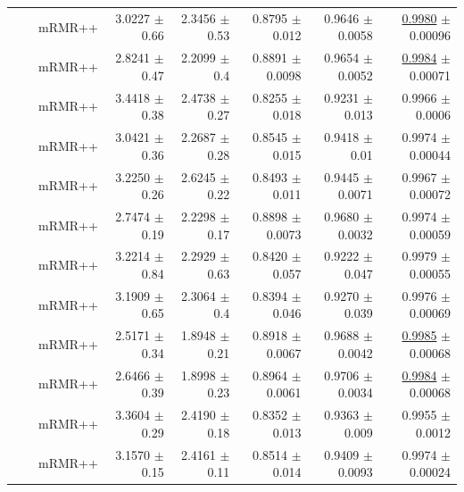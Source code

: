 \begin{longtable}{llp{}rrrrr}
 &  & mRMR++ & 3.0227 {\scriptsize $\pm$ 0.66} & 2.3456 {\scriptsize $\pm$ 0.53} & 0.8795 {\scriptsize $\pm$ 0.012} & 0.9646 {\scriptsize $\pm$ 0.0058} & \underline{0.9980} {\scriptsize $\pm$ 0.00096} \\
 &  & mRMR++ & 2.8241 {\scriptsize $\pm$ 0.47} & 2.2099 {\scriptsize $\pm$ 0.4} & 0.8891 {\scriptsize $\pm$ 0.0098} & 0.9654 {\scriptsize $\pm$ 0.0052} & \underline{0.9984} {\scriptsize $\pm$ 0.00071} \\
 &  & mRMR++ & 3.4418 {\scriptsize $\pm$ 0.38} & 2.4738 {\scriptsize $\pm$ 0.27} & 0.8255 {\scriptsize $\pm$ 0.018} & 0.9231 {\scriptsize $\pm$ 0.013} & 0.9966 {\scriptsize $\pm$ 0.0006} \\
 &  & mRMR++ & 3.0421 {\scriptsize $\pm$ 0.36} & 2.2687 {\scriptsize $\pm$ 0.28} & 0.8545 {\scriptsize $\pm$ 0.015} & 0.9418 {\scriptsize $\pm$ 0.01} & 0.9974 {\scriptsize $\pm$ 0.00044} \\
 &  & mRMR++ & 3.2250 {\scriptsize $\pm$ 0.26} & 2.6245 {\scriptsize $\pm$ 0.22} & 0.8493 {\scriptsize $\pm$ 0.011} & 0.9445 {\scriptsize $\pm$ 0.0071} & 0.9967 {\scriptsize $\pm$ 0.00072} \\
 &  & mRMR++ & 2.7474 {\scriptsize $\pm$ 0.19} & 2.2298 {\scriptsize $\pm$ 0.17} & 0.8898 {\scriptsize $\pm$ 0.0073} & 0.9680 {\scriptsize $\pm$ 0.0032} & 0.9974 {\scriptsize $\pm$ 0.00059} \\
 &  & mRMR++ & 3.2214 {\scriptsize $\pm$ 0.84} & 2.2929 {\scriptsize $\pm$ 0.63} & 0.8420 {\scriptsize $\pm$ 0.057} & 0.9222 {\scriptsize $\pm$ 0.047} & 0.9979 {\scriptsize $\pm$ 0.00055} \\
 &  & mRMR++ & 3.1909 {\scriptsize $\pm$ 0.65} & 2.3064 {\scriptsize $\pm$ 0.4} & 0.8394 {\scriptsize $\pm$ 0.046} & 0.9270 {\scriptsize $\pm$ 0.039} & 0.9976 {\scriptsize $\pm$ 0.00069} \\
 &  & mRMR++ & 2.5171 {\scriptsize $\pm$ 0.34} & 1.8948 {\scriptsize $\pm$ 0.21} & 0.8918 {\scriptsize $\pm$ 0.0067} & 0.9688 {\scriptsize $\pm$ 0.0042} & \underline{0.9985} {\scriptsize $\pm$ 0.00068} \\
 &  & mRMR++ & 2.6466 {\scriptsize $\pm$ 0.39} & 1.8998 {\scriptsize $\pm$ 0.23} & 0.8964 {\scriptsize $\pm$ 0.0061} & 0.9706 {\scriptsize $\pm$ 0.0034} & \underline{0.9984} {\scriptsize $\pm$ 0.00068} \\
 &  & mRMR++ & 3.3604 {\scriptsize $\pm$ 0.29} & 2.4190 {\scriptsize $\pm$ 0.18} & 0.8352 {\scriptsize $\pm$ 0.013} & 0.9363 {\scriptsize $\pm$ 0.009} & 0.9955 {\scriptsize $\pm$ 0.0012} \\
 &  & mRMR++ & 3.1570 {\scriptsize $\pm$ 0.15} & 2.4161 {\scriptsize $\pm$ 0.11} & 0.8514 {\scriptsize $\pm$ 0.014} & 0.9409 {\scriptsize $\pm$ 0.0093} & 0.9974 {\scriptsize $\pm$ 0.00024} \\

\end{longtable}
